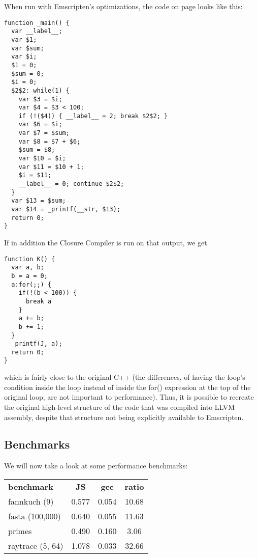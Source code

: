 \documentclass[11pt]{proc}
\begin{document}
When run with Emscripten's optimizations, the code on page \pageref{code:example} looks
like this:
\begin{verbatim}
function _main() {
  var __label__;
  var $1;
  var $sum;
  var $i;
  $1 = 0;
  $sum = 0;
  $i = 0;
  $2$2: while(1) {
    var $3 = $i;
    var $4 = $3 < 100;
    if (!($4)) { __label__ = 2; break $2$2; }
    var $6 = $i;
    var $7 = $sum;
    var $8 = $7 + $6;
    $sum = $8;
    var $10 = $i;
    var $11 = $10 + 1;
    $i = $11;
    __label__ = 0; continue $2$2;
  }
  var $13 = $sum;
  var $14 = _printf(__str, $13);
  return 0;
}
\end{verbatim}
If in addition the Closure Compiler is run on that output, we get
\begin{verbatim}
function K() {
  var a, b;
  b = a = 0;
  a:for(;;) {
    if(!(b < 100)) {
      break a
    }
    a += b;
    b += 1;
  }
  _printf(J, a);
  return 0;
}
\end{verbatim}
which is fairly close to the original C++ (the differences, of
having the loop's condition inside the loop instead of inside
the for() expression at the top of the original loop, are not important to performance). Thus, it is possible
to recreate the original high-level structure of the code that
was compiled into LLVM assembly, despite that structure not being
explicitly available to Emscripten.

\subsection{Benchmarks}

We will now take a look at some performance benchmarks:

\bigskip

\begin{tabular}{ l | c | c | c }
  \hline
  \textbf{benchmark} & \textbf{JS} & \textbf{gcc} & \textbf{ratio} \\
  fannkuch (9)     & 0.577 & 0.054 &  10.68 \\
  fasta (100,000)  & 0.640 & 0.055 &  11.63 \\
  primes           & 0.490 & 0.160 &   3.06 \\
  raytrace (5, 64) & 1.078 & 0.033 &  32.66 \\
  \hline
\end{tabular}

\bigskip
\end{document}
